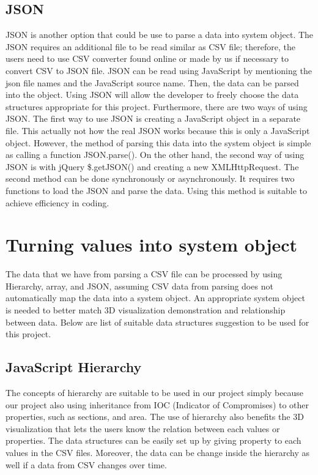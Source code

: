 \documentclass[letterpaper,10pt,titlepage, onecolumn, draftclsnofoot]{IEEEtran}
\begin{document}
\subsection{JSON}
JSON is another option that could be use to parse a data into system object. The JSON requires an additional file to be read similar as CSV file; therefore, the users need to use CSV converter found online or made by us if necessary to convert CSV to JSON file. JSON can be read using JavaScript by mentioning the json file names and the JavaScript source name. Then, the data can be parsed into the object. Using JSON will allow the developer to freely choose the data structures appropriate for this project. Furthermore, there are two ways of using JSON\cite{loadjson}.
\newline
\indent The first way to use JSON is creating a JavaScript object in a separate file. This actually not how the real JSON works because this is only a JavaScript object. However, the method of parsing this data into the system object is simple as calling a function JSON.parse(). On the other hand, the second way of using JSON is with jQuery \$.getJSON() and creating a new XMLHttpRequest. The second method can be done synchronously or asynchronously. It requires two functions to load the JSON and parse the data. Using this method is suitable to achieve efficiency in coding.

\section{Turning values into system object}
The data that we have from parsing a CSV file can be processed by using Hierarchy, array, and JSON, assuming CSV data from parsing does not automatically map the data into a system object. An appropriate system object is needed to better match 3D visualization demonstration and relationship between data. Below are list of suitable data structures suggestion to be used for this project.

\subsection{JavaScript Hierarchy}
The concepts of hierarchy\cite{hierarchy} are suitable to be used in our project simply because our project also using inheritance from IOC (Indicator of Compromises) to other properties, such as sections, and area. The use of hierarchy also benefits the 3D visualization that lets the users know the relation between each values or properties. The data structures can be easily set up by giving property to each values in the CSV files. Moreover, the data can be change inside the hierarchy as well if a data from CSV changes over time.
\end{document}
